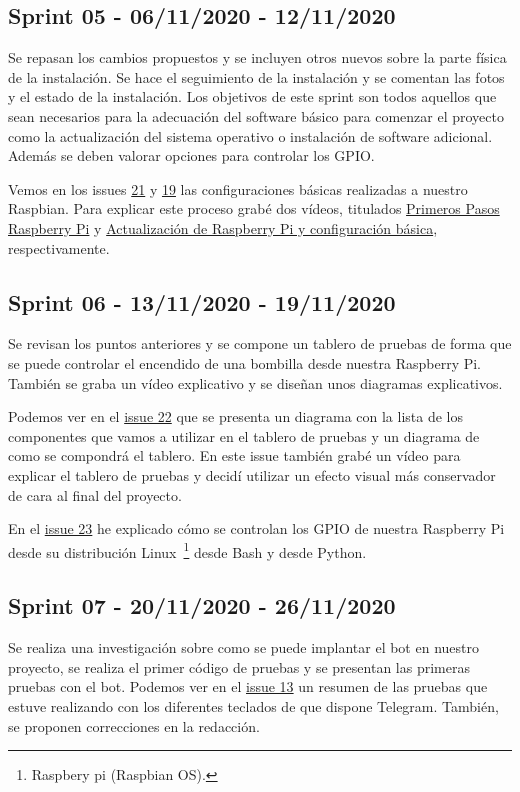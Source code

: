\subsection{Sprint 05 - 06/11/2020 - 12/11/2020}
Se repasan los cambios propuestos y se incluyen otros nuevos sobre la parte física de la instalación. Se hace el seguimiento de la instalación y se comentan las fotos y el estado de la instalación.
Los objetivos de este sprint son todos aquellos que sean necesarios para la adecuación del software básico para comenzar el proyecto como la actualización del sistema operativo o instalación de software adicional. Además se deben valorar opciones para controlar los GPIO.

Vemos en los issues \href{https://github.com/davidelinformatico/TFG/issues/21}{21} y \href{https://github.com/davidelinformatico/TFG/issues/19}{19} las configuraciones básicas realizadas a nuestro Raspbian. Para explicar este proceso grabé dos vídeos, titulados \href{https://youtu.be/B8E6q1fLp7Q}{Primeros Pasos Raspberry Pi} y \href{https://youtu.be/Vz38sGYpcYQ}{Actualización de Raspberry Pi y configuración básica}, respectivamente.

\subsection{Sprint 06 - 13/11/2020 - 19/11/2020}
Se revisan los puntos anteriores y se compone un tablero de pruebas de forma que se puede controlar el encendido de una bombilla desde nuestra Raspberry Pi. También se graba un vídeo explicativo y se diseñan unos diagramas explicativos.

Podemos ver en el \href{https://github.com/davidelinformatico/TFG/issues/22}{issue 22} que se presenta un diagrama con la lista de los componentes que vamos a utilizar en el tablero de pruebas y un diagrama de como se compondrá el tablero. En este issue también grabé un vídeo para explicar el tablero de pruebas y decidí utilizar un efecto visual más conservador de cara al final del proyecto.

En el \href{https://github.com/davidelinformatico/TFG/issues/23}{issue 23} he explicado cómo se controlan los GPIO de nuestra Raspberry Pi desde su distribución Linux~\footnote{Raspbery pi (Raspbian OS).} desde Bash y desde Python.

\subsection{Sprint 07 - 20/11/2020 - 26/11/2020}
Se realiza una investigación sobre como se puede implantar el bot en nuestro proyecto, se realiza el primer código de pruebas y se presentan las primeras pruebas con el bot. Podemos ver en el \href{https://github.com/davidelinformatico/TFG/issues/13}{issue 13} un resumen de las pruebas que estuve realizando con los diferentes teclados de que dispone Telegram.
También, se proponen correcciones en la redacción.

